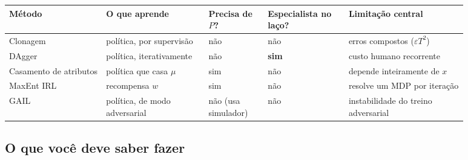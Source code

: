 \documentclass[11pt]{article}
\newcommand{\feat}{x}
\newcommand{\mufeat}{\mu}
\newcommand{\wv}{w}
\begin{document}
\begin{center}\small
\begin{tabular}{@{}>{\raggedright\arraybackslash}p{0.185\linewidth}
                 >{\raggedright\arraybackslash}p{0.195\linewidth}
                 >{\raggedright\arraybackslash}p{0.115\linewidth}
                 >{\raggedright\arraybackslash}p{0.155\linewidth}
                 >{\raggedright\arraybackslash}p{0.225\linewidth}@{}}
\toprule
\textbf{Método} & \textbf{O que aprende} & \textbf{Precisa de $P$?} &
\textbf{Especialista no laço?} & \textbf{Limitação central} \\
\midrule
Clonagem & política, por supervisão & não & não & erros compostos ($\varepsilon T^2$) \\
DAgger & política, iterativamente & não & \textbf{sim} & custo humano recorrente \\
Casamento de atributos & política que casa $\mufeat$ & sim & não & depende inteiramente de $\feat$ \\
MaxEnt IRL & recompensa $\wv$ & sim & não & resolve um MDP por iteração \\
GAIL & política, de modo adversarial & não (usa simulador) & não & instabilidade do treino adversarial \\
\bottomrule
\end{tabular}
\end{center}

\subsection{O que você deve saber fazer}
\end{document}
